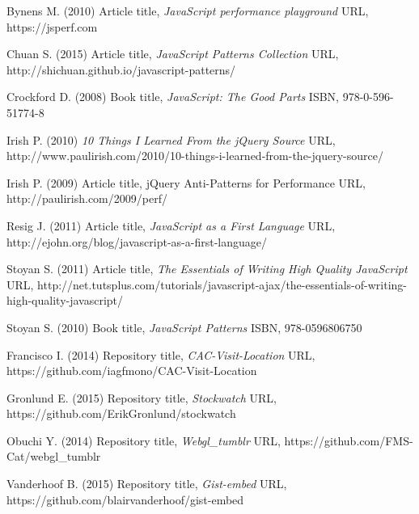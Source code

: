 \documentclass{bioinfo}
\begin{document}
\begin{thebibliography}{}

 Bynens M. (2010) Article title, {\it JavaScript performance playground} URL, https://jsperf.com

 Chuan S. (2015) Article title, {\it JavaScript Patterns Collection} URL, http://shichuan.github.io/javascript-patterns/

 Crockford D. (2008) Book title, {\it JavaScript: The Good Parts} ISBN, 978-0-596-51774-8

 Irish P. (2010) {\it 10 Things I Learned From the jQuery Source} URL, http://www.paulirish.com/2010/10-things-i-learned-from-the-jquery-source/

 Irish P. (2009) Article title, {jQuery Anti-Patterns for Performance} URL, http://paulirish.com/2009/perf/

 Resig J. (2011) Article title, {\it JavaScript as a First Language} URL, http://ejohn.org/blog/javascript-as-a-first-language/

 Stoyan S. (2011) Article title, {\it The Essentials of Writing High Quality JavaScript} URL, http://net.tutsplus.com/tutorials/javascript-ajax/the-essentials-of-writing-high-quality-javascript/

 Stoyan S. (2010) Book title, {\it JavaScript Patterns} ISBN, 978-0596806750

 Francisco I. (2014) Repository title, {\it CAC-Visit-Location} URL, https://github.com/iagfmono/CAC-Visit-Location

 Gronlund E. (2015) Repository title, {\it Stockwatch} URL, https://github.com/ErikGronlund/stockwatch

 Obuchi Y. (2014) Repository title, {\it Webgl\_tumblr} URL, https://github.com/FMS-Cat/webgl\_tumblr

 Vanderhoof B. (2015) Repository title, {\it Gist-embed} URL, https://github.com/blairvanderhoof/gist-embed

\end{thebibliography}
\end{document}
